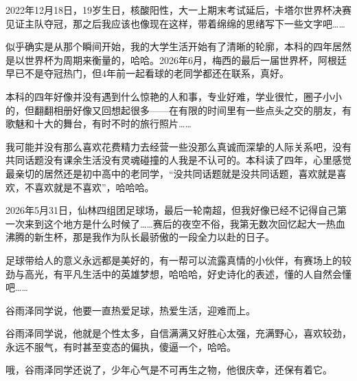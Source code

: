 \documentclass[
    decl-page,  %
  ]{njuthesis}
\begin{document}

\printbibliography


\begin{acknowledgement}
2022年12月18日，19岁生日，核酸阳性，大一上期末考试延后，卡塔尔世界杯决赛见证主队夺冠，那之后我应该也像现在这样，带着绵绵的思绪写下一些文字吧……

似乎确实是从那个瞬间开始，我的大学生活开始有了清晰的轮廓，本科的四年居然是以世界杯为周期来衡量的，哈哈。2026年6月，梅西的最后一届世界杯，阿根廷早已不是夺冠热门，但4年前一起看球的老同学都还在联系，真好。

本科的四年好像并没有遇到什么惊艳的人和事，专业好难，学业很忙，圈子小小的，但翻翻相册好像又回想起很多——在有限的时间里有一些点头之交的朋友，有歌魅和十大的舞台，有时不时的旅行照片……

我可能并没有那么喜欢花费精力去经营一些没那么真诚而深挚的人际关系吧，没有共同话题没有课余生活没有灵魂碰撞的人我是不认可的。本科读了四年，心里感觉最亲切的居然还是初中高中的老同学，“没共同话题就是没共同话题，喜欢就是喜欢，不喜欢就是不喜欢”，哈哈哈。

2026年5月31日，仙林四组团足球场，最后一轮南超，但我好像已经不记得自己第一次来到这个地方是什么时候了……赛后的夜空不俗，我第无数次回忆起大一热血沸腾的新生杯，那是我作为队长最骄傲的一段全力以赴的日子。

足球带给人的意义永远都是美好的，有一帮可以流露真情的小伙伴，有赛场上的较劲与高光，有平凡生活中的英雄梦想，哈哈哈，好史诗化的表述，懂的人自然会懂吧……

谷雨泽同学说，他要一直热爱足球，热爱生活，迎难而上。

谷雨泽同学说，他就是个性太多，自信满满又好胜心太强，充满野心，喜欢较劲，永远不服气，有时甚至变态的偏执，傻逼一个，哈哈。

哦，谷雨泽同学还说了，少年心气是不可再生之物，他很庆幸，还保有着它。
\end{acknowledgement}

\end{document}
